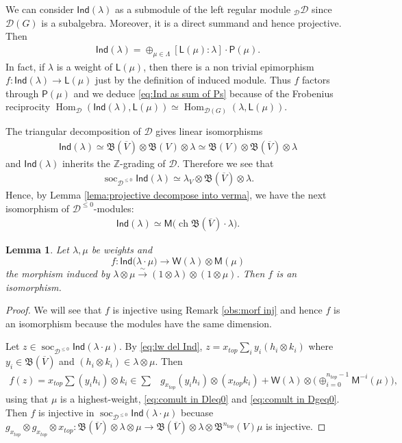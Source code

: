 \documentclass[reqno]{amsart}
\newcommand{\xtop}{x_{top}}
\newcommand{\oV}{\overline{V}}
\renewcommand{\_}[1]{_{\left( #1 \right)}}
\renewcommand{\^}[1]{^{\left( #1 \right)}}
\newcommand{\ot}{{\otimes}}
\newcommand\fInd{\mathsf{Ind}}
\newcommand\fL{\mathsf{L}}
\newcommand\fM{\mathsf{M}}
\newcommand\fP{\mathsf{P}}
\newcommand\fW{\mathsf{W}}
\newcommand{\Z}{{\mathbb Z}}
\newcommand{\D}{\mathcal{D}}
\newcommand{\BV}{{\mathfrak B}}
\newcommand{\ch}{\operatorname{ch}}
\newcommand\Hom{\operatorname{Hom}}
\newcommand\soc{\operatorname{soc}_{\D^{\leq0}}}
\theoremstyle{plain}
\newtheorem{lema}{Lemma}[section]
\theoremstyle{definition}
\theoremstyle{remark}
\begin{document}
We can consider $\fInd(\lambda)$ as a submodule of the left regular module ${}_{\D}\D$ since $\D(G)$ is a subalgebra. Moreover, it is a direct summand and hence projective. Then
\begin{align}\label{eq:Ind as sum of Ps}
\fInd(\lambda)=\oplus_{\mu\in\Lambda}[\fL(\mu):\lambda]\cdot\fP(\mu). 
\end{align}
In fact, if $\lambda$ is a weight of $\fL(\mu)$, then there is a non trivial epimorphism $f:\fInd(\lambda)\rightarrow\fL(\mu)$ just by the definition of induced module. Thus $f$ factors through  $\fP(\mu)$ and we deduce \eqref{eq:Ind as sum of Ps} because of the Frobenius reciprocity $\Hom_{\D}(\fInd(\lambda),\fL(\mu))\simeq\Hom_{\D(G)}(\lambda,\fL(\mu))$.

The triangular decomposition of $\D$ gives linear isomorphisms
\begin{align}\label{eq:triangular for Ind}
\fInd(\lambda)\simeq\BV(\oV)\ot\BV(V)\ot\lambda\simeq\BV(V)\ot\BV(\oV)\ot\lambda
\end{align}
and $\fInd(\lambda)$ inherits the $\Z$-grading of $\D$. 
Therefore we see that
\begin{align}\label{eq:lw del Ind}
\soc\fInd(\lambda)\simeq\lambda_V\ot\BV(\oV)\ot\lambda.
\end{align}
Hence, by Lemma \ref{lema:projective decompose into verma}, we have the next isomorphism of $\D^{\leq0}$-modules:
\begin{align}\label{eq:Ind as sum of vermas}
\fInd(\lambda)\simeq\fM\bigl(\ch\BV(\oV)\cdot\lambda\bigr).
\end{align}

\begin{lema}\label{le: W ot M}
Let $\lambda,\mu$ be weights and
$$
f:\fInd\bigl(\lambda\cdot\mu\bigr)\longrightarrow\fW(\lambda)\ot\fM(\mu)
$$
the morphism induced by $\lambda\ot\mu\overset{\sim}{\longrightarrow}(1\ot\lambda)\ot(1\ot\mu)$. Then $f$ is an isomorphism.
\end{lema}

\begin{proof}
We will see that $f$ is injective using Remark \ref{obs:morf inj} and hence $f$ is an isomorphism because the modules have the same dimension. 

Let $z\in\soc\fInd(\lambda\cdot\mu)$. By \eqref{eq:lw del Ind}, $z=\xtop \sum_i y_i (h_i\ot k_i)$ where $y_i\in\BV(\oV)$ and $(h_i\ot k_i)\in\lambda\ot\mu$. Then 
\begin{align*}
f(z)=\xtop \sum (y_ih_i)\ot k_i\in \sum & g_{\xtop}(y_ih_i)\ot(\xtop k_i)+\fW(\lambda)\ot\bigl(\oplus_{i=0}^{n_{top}-1}\fM^{-i}(\mu)\bigr),
\end{align*}
using that $\mu$ is a highest-weight, \eqref{eq:comult in Dleq0} and \eqref{eq:comult in Dgeq0}. Then $f$ is injective in $\soc\fInd(\lambda\cdot\mu)$ becuase 
$g_{\xtop}\ot g_{\xtop}\ot\xtop:\BV(\oV)\ot\lambda\ot\mu\longrightarrow\BV(\oV)\ot\lambda\ot\BV^{n_{top}}(V)\mu$ is injective.
\end{proof}
\end{document}
